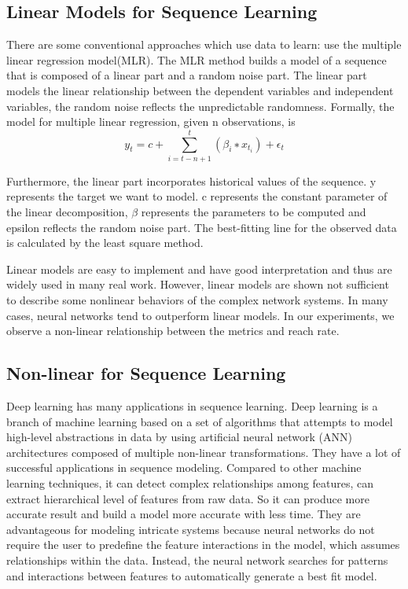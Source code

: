 \documentclass[5p]{elsarticle}
\newcommand{\dabiaolv}{reach rate}
\begin{document}
\subsection{Linear Models for Sequence Learning}

There are some conventional approaches which use data to learn: use the multiple linear regression model(MLR). The MLR method builds a model of a sequence that is composed of a linear part and a random noise part. The linear part models the linear relationship between the dependent variables and independent variables, the random noise reflects the unpredictable randomness. Formally, the model for multiple linear regression, given n observations, is 
    $$y_t = c+\sum_{i=t-n+1}^{t}(\beta_i ∗ x_{t_i})+\epsilon_t$$

Furthermore, the linear part incorporates historical values of the sequence. y represents the target we want to model. c represents the constant parameter of the linear decomposition, $\beta$ represents the parameters to be computed and epsilon reflects the random noise part. The best-fitting line for the observed data is calculated by the least square method.

Linear models are easy to implement and have good interpretation and thus are widely used in many real work. However, linear models are shown not sufficient to describe some nonlinear behaviors of the complex network systems. In many cases, neural networks tend to outperform linear models. In our experiments, we observe a non-linear relationship between the metrics and \dabiaolv.

\subsection{Non-linear for Sequence Learning}

Deep learning has many applications in sequence learning. Deep learning is a branch of machine learning based on a set of algorithms that attempts to model high-level abstractions in data by using artificial neural network (ANN) architectures composed of multiple non-linear transformations. They have a lot of successful applications in sequence modeling. Compared to other machine learning techniques, it can detect complex relationships among features, can extract hierarchical level of features from raw data. So it can produce more accurate result and build a model more accurate with less time. They are advantageous for modeling intricate systems because neural networks do not require the user to predefine the feature interactions in the model, which assumes relationships within the data. Instead, the neural network searches for patterns and interactions between features to automatically generate a best fit model.
\end{document}
